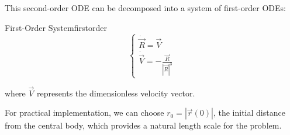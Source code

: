 \documentclass[12pt]{article}
\begin{document}
This second-order ODE can be decomposed into a system of first-order ODEs:

\begin{equation_maths}{First-Order System}{firstorder}
    {\large
    \[
    \begin{cases}
    \dot{\vec{R}} = \vec{V} \\
    \dot{\vec{V}} = -\frac{\vec{R}}{|\vec{R}|^3}
    \end{cases}
    \]
    }
\end{equation_maths}

where $\vec{V}$ represents the dimensionless velocity vector.

For practical implementation, we can choose $r_0 = |\vec{r}(0)|$, the initial distance from the central body, which provides a natural length scale for the problem.
\end{document}
